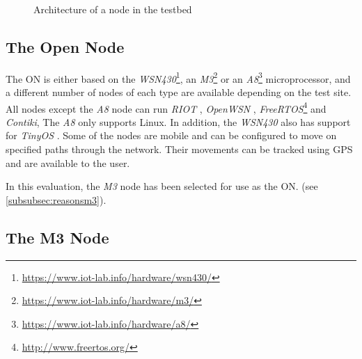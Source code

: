 \begin{figure}[h]
  \centering
  \caption{Architecture of a \fitlab node in the testbed}
  \label{fig:fitnode}
\end{figure}

\subsection{The Open Node}

The \ac{ON} is either based on the
\emph{WSN430}\footnote{\url{https://www.iot-lab.info/hardware/wsn430/}}, an
\emph{M3}\footnote{\url{https://www.iot-lab.info/hardware/m3/}} or an
\emph{A8}\footnote{\url{https://www.iot-lab.info/hardware/a8/}} microprocessor,
and a different number of nodes of each type are available depending on the test
site. All nodes except the \emph{A8} node can run \emph{RIOT}
\cite{baccelli2013riot}, \emph{OpenWSN} \cite{watteyne2012openwsn},
\emph{FreeRTOS}\footnote{\url{http://www.freertos.org/}} and \emph{Contiki},
The \emph{A8} only supports
Linux. In addition, the \emph{WSN430}
also has support for \emph{TinyOS} \cite{levis2005tinyos}. Some of the nodes are
mobile and can be configured to move on specified paths through the network.
Their movements can be tracked using \ac{GPS} and are available to the user.

In this evaluation, the \emph{M3} node has been selected for use as the \ac{ON}.
(see \autoref{subsubsec:reasonsm3}).

\subsection{The M3 Node}
\label{subsec:m3}

